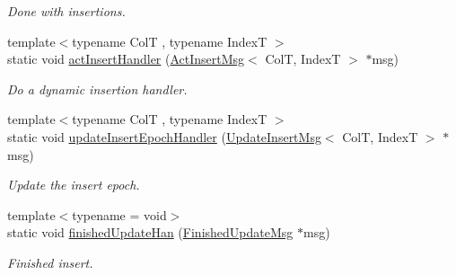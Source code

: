 \begin{DoxyCompactItemize}
\begin{DoxyCompactList}\small\item\em Done with insertions. \end{DoxyCompactList}\item 
{\footnotesize template$<$typename ColT , typename IndexT $>$ }\\static void \hyperlink{structvt_1_1vrt_1_1collection_1_1_collection_manager_a0c2b3a0d98264432181392ff178d5782}{act\+Insert\+Handler} (\hyperlink{structvt_1_1vrt_1_1collection_1_1_act_insert_msg}{Act\+Insert\+Msg}$<$ ColT, IndexT $>$ $\ast$msg)
\begin{DoxyCompactList}\small\item\em Do a dynamic insertion handler. \end{DoxyCompactList}\item 
{\footnotesize template$<$typename ColT , typename IndexT $>$ }\\static void \hyperlink{structvt_1_1vrt_1_1collection_1_1_collection_manager_afe9a779bc2dd8c639cf0dea5d910ec4b}{update\+Insert\+Epoch\+Handler} (\hyperlink{structvt_1_1vrt_1_1collection_1_1_update_insert_msg}{Update\+Insert\+Msg}$<$ ColT, IndexT $>$ $\ast$msg)
\begin{DoxyCompactList}\small\item\em Update the insert epoch. \end{DoxyCompactList}\item 
{\footnotesize template$<$typename  = void$>$ }\\static void \hyperlink{structvt_1_1vrt_1_1collection_1_1_collection_manager_a1e3aca203f1197782ec543da1d16b115}{finished\+Update\+Han} (\hyperlink{structvt_1_1vrt_1_1collection_1_1_finished_update_msg}{Finished\+Update\+Msg} $\ast$msg)
\begin{DoxyCompactList}\small\item\em Finished insert. \end{DoxyCompactList}\end{DoxyCompactItemize}
